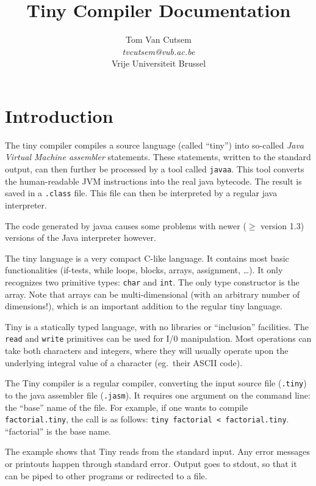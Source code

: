 \documentclass[a4paper]{article}
\author{Tom Van Cutsem\\
\textsl{tvcutsem@vub.ac.be}\\
Vrije Universiteit Brussel}
\title{Tiny Compiler Documentation}
\begin{document}
\maketitle

\tableofcontents

\section{Introduction}

The tiny compiler compiles a source language (called ``tiny'') into so-called
\textsl{Java Virtual Machine assembler} statements. These statements, written
to the standard output, can then further be processed by a tool called
\texttt{javaa}. This tool converts the human-readable JVM instructions into
the real java bytecode. The result is saved in a \texttt{.class} file. This
file can then be interpreted by a regular java interpreter.

The code generated by javaa causes some problems with newer ($\geq$ version
1.3) versions of the Java interpreter however.

The tiny language is a very compact C-like language. It contains most basic
functionalities (if-tests, while loops, blocks, arrays, assignment, \ldots{}).
It only recognizes two primitive types: \texttt{char} and \texttt{int}. The
only type constructor is the array. Note that arrays can be multi-dimensional
(with an arbitrary number of dimensions!), which is an important addition to
the regular tiny language.

Tiny is a statically typed language, with no libraries or ``inclusion''
facilities. The \texttt{read} and \texttt{write} primitives can be used for
I/0 manipulation. Most operations can take both characters and integers, where
they will usually operate upon the underlying integral value of a character
(eg.~their ASCII code).

The Tiny compiler is a regular compiler, converting the input source file
(\texttt{.tiny}) to the java assembler file (\texttt{.jasm}). It requires
one argument on the command line: the ``base'' name of the file. For example,
if one wants to compile \texttt{factorial.tiny}, the call is as follows:
\texttt{tiny factorial < factorial.tiny}. ``factorial'' is the base name.

The example shows that Tiny reads from the standard input. Any error
messages or printouts happen through standard error. Output goes to stdout, so
that it can be piped to other programs or redirected to a file.
\end{document}
